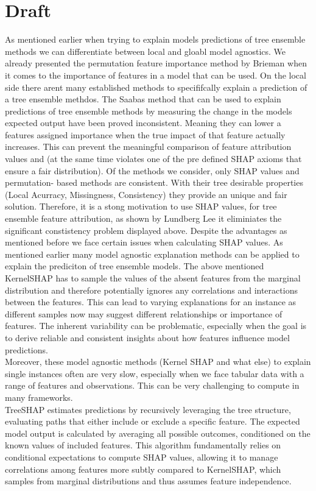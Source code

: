 \documentclass[12pt]{article}
\begin{document}
\section{Draft}
As mentioned earlier when trying to explain models predictions of tree ensemble methods we can differentiate between local and gloabl model agnostics. We already presented the permutation feature importance method by Brieman when it comes to the importance of features in a model that can be used. On the local side there arent many established methods to specififcally explain a prediction of a tree ensemble methdos.
The Saabas method that can be used to explain predictions of tree ensemble methods by measuring the change in the models expected output have been proved inconsistent.
Meaning they can lower a features assigned importance when the true impact of that feature actually increases. This can prevent the meaningful comparison of feature attribution values and (at the same time violates one of the pre defined SHAP axioms that ensure a fair distribution). Of the methods we consider, only SHAP values and permutation- based methods are consistent. With their tree desirable properties (Local Acurracy, Missingness, Consistency) they provide an unique and fair solution.
Therefore, it is a stong motivation to use SHAP values, for tree ensemble feature attribution, as shown by Lundberg Lee it eliminiates the significant constistency problem displayed above. 
Despite the advantages as mentioned before we face certain issues when calculating SHAP values.
As mentioned earlier many model agnostic explanation methods can be applied to explain the prediciton of tree ensemble models. The above mentioned KernelSHAP has to sample the values of the absent features from the marginal distribution and therefore potentially ignores any correlations and interactions between the features. This can lead to varying explanations for an instance as different samples now may suggest different relationships or importance of features. The inherent variability can be problematic, especially when the goal is to derive reliable and consistent insights about how features influence model predictions. \\
Moreover, these model agnostic methods (Kernel SHAP and what else) to explain single instances often are very slow, especially when we face tabular data with a range of features and observations. This can be very challenging to compute in many frameworks. \\
TreeSHAP estimates predictions by recursively leveraging the tree structure, evaluating paths that either include or exclude a specific feature. The expected model output is calculated by averaging all possible outcomes, conditioned on the known values of included features. This algorithm fundamentally relies on conditional expectations to compute SHAP values, allowing it to manage correlations among features more subtly compared to KernelSHAP, which samples from marginal distributions and thus assumes feature independence.
\end{document}
